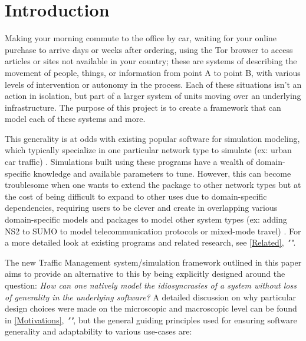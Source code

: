 \chapter{Introduction}
\label{Intro}

\par Making your morning commute to the office by car, waiting for your online purchase to arrive days or weeks after ordering, using the Tor browser to access articles or sites not available in your country; these are systems of describing the movement of people, things, or information from point A to point B, with various levels of intervention or autonomy in the process.  Each of these situations isn't an action in isolation, but part of a larger system of units moving over an underlying infrastructure.  The purpose of this project is to create a framework that can model each of these systems and more. \\

\par This generality is at odds with existing popular software for simulation modeling, which typically specialize in one particular network type to simulate (ex: urban car traffic) \cite{LWB18}.  Simulations built using these programs have a wealth of domain-specific knowledge and available parameters to tune.  However, this can become troublesome when one wants to extend the package to other network types but at the cost of being difficult to expand to other uses due to domain-specific dependencies, requiring users to be clever and create in overlapping various domain-specific models and packages to model other system types (ex:  adding NS2 to SUMO to model telecommunication protocols or mixed-mode travel) \cite{LC08} \cite{SKMR14}.  For a more detailed look at existing programs and related research, see \autoref{Related}, \textit{""}.   \\

\par The new Traffic Management system/simulation framework outlined in this paper aims to provide an alternative to this by being explicitly designed around the question:  \textit{How can one natively model the idiosyncrasies of a system without loss of generality in the underlying software?}  A detailed discussion on why particular design choices were made on the microscopic and macroscopic level can be found in \autoref{Motivations}, \textit{""}, but the general guiding principles used for ensuring software generality and adaptability to various use-cases are:

